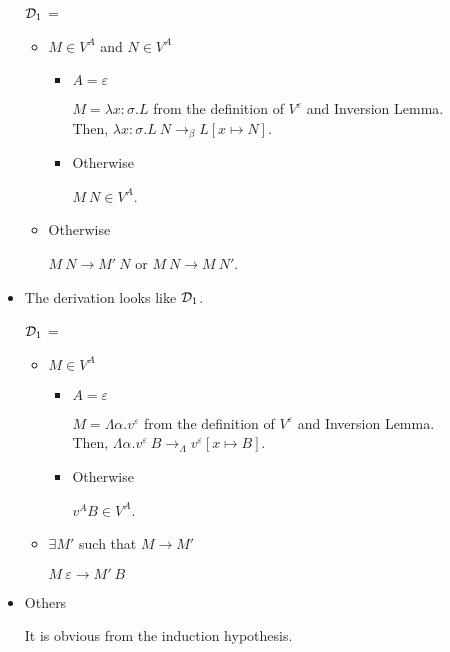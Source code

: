 \begin{itemize}
	      $\mathcal{D}_1$ = 
	      { \andalso {}}

	      \begin{itemize}
		      \item $M \in V^A$ and $N \in V^A$

		            \begin{itemize}
			            \item $A=\varepsilon$

			                  $M = \lambda x:\sigma.L$ from the definition of $V^\varepsilon$ and Inversion Lemma.\\
			                  Then, $\lambda x:\sigma.L\ N \longrightarrow_\beta L[x\mapsto N]$.
			            \item Otherwise

			                  $M\ N \in V^A$.
		            \end{itemize}
		      \item Otherwise

		            $M\ N \longrightarrow M'\ N$ or $M\ N \longrightarrow M\ N'$.
	      \end{itemize}

	\item \TIns

	      The derivation looks like $\mathcal{D}_1$.

	      $\mathcal{D}_1$ = 
	      {}

	      \begin{itemize}
		      \item $ M \in V^A $

		            \begin{itemize}
			            \item $A=\varepsilon$

			                  $M = \Lambda\alpha.v^\varepsilon$ from the definition of $V^\varepsilon$ and Inversion Lemma.\\
			                  Then, $\Lambda\alpha.v^\varepsilon\ B \longrightarrow_\Lambda v^\varepsilon[x\mapsto B]$.

			            \item Otherwise

			                  $v^A B \in V^A$.
		            \end{itemize}

		      \item $\exists M'$ such that $M \longrightarrow M'$

		            $M\ \varepsilon \longrightarrow M'\ B$
	      \end{itemize}

	\item Others

	      It is obvious from the induction hypothesis.

\end{itemize}

